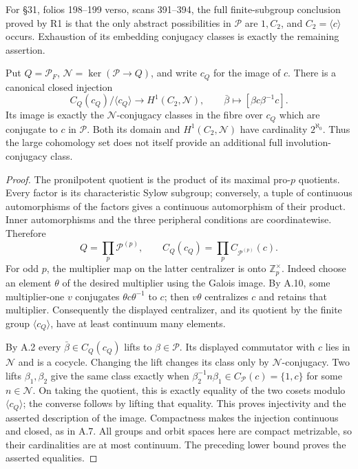 For \S31, folios 198--199 verso, scans
391--394, the full finite-subgroup conclusion
proved by R1 is that the only abstract
possibilities in \(\mathcal P\) are \(1,C_2\),
and \(C_2=\langle c\rangle\) occurs.
Exhaustion of its embedding conjugacy
classes is exactly the remaining assertion.

Put \(Q=\mathcal P_F\), \(\mathcal N=\ker(\mathcal P\to Q)\),
and write \(c_Q\) for the image of \(c\). There is a canonical
closed injection
\[
 C_Q(c_Q)/\langle c_Q\rangle
 \longrightarrow H^1(C_2,\mathcal N),\qquad
 \bar\beta\longmapsto[\beta c\beta^{-1}c].
\]
Its image is exactly the \(\mathcal N\)-conjugacy classes in the
fibre over \(c_Q\) which are conjugate to \(c\) in \(\mathcal P\).
Both its domain and \(H^1(C_2,\mathcal N)\) have cardinality
\(2^{\aleph_0}\). Thus the large cohomology set does not itself
provide an additional full involution-conjugacy class.

\begin{proof}
The pronilpotent quotient is the product of its maximal
pro-\(p\) quotients. Every factor is its characteristic
Sylow subgroup; conversely, a tuple of continuous
automorphisms of the factors gives a continuous automorphism
of their product. Inner automorphisms and the three peripheral
conditions are coordinatewise. Therefore
\[
 Q=\prod_p\mathcal P^{(p)},\qquad
 C_Q(c_Q)=\prod_p C_{\mathcal P^{(p)}}(c).
\]
For odd \(p\), the multiplier map on the latter centralizer
is onto \(\mathbb Z_p^\times\). Indeed choose an element
\(\theta\) of the desired multiplier using the Galois image.
By A.10, some multiplier-one \(v\) conjugates
\(\theta c\theta^{-1}\) to \(c\); then \(v\theta\)
centralizes \(c\) and retains that multiplier.
Consequently the displayed centralizer, and its quotient
by the finite group \(\langle c_Q\rangle\), have at least
continuum many elements.

By A.2 every \(\bar\beta\in C_Q(c_Q)\) lifts to
\(\beta\in\mathcal P\). Its displayed commutator with
\(c\) lies in \(\mathcal N\) and is a cocycle.
Changing the lift changes its class only by
\(\mathcal N\)-conjugacy. Two lifts \(\beta_1,\beta_2\)
give the same class exactly when
\(\beta_2^{-1}n\beta_1\in C_{\mathcal P}(c)=\{1,c\}\)
for some \(n\in\mathcal N\). On taking the quotient,
this is exactly equality of the two cosets modulo
\(\langle c_Q\rangle\); the converse follows by lifting
that equality. This proves injectivity and the asserted
description of the image.
Compactness makes the injection continuous and closed,
as in A.7. All groups and orbit spaces here are compact
metrizable, so their cardinalities are at most continuum.
The preceding lower bound proves the asserted equalities.
\end{proof}

